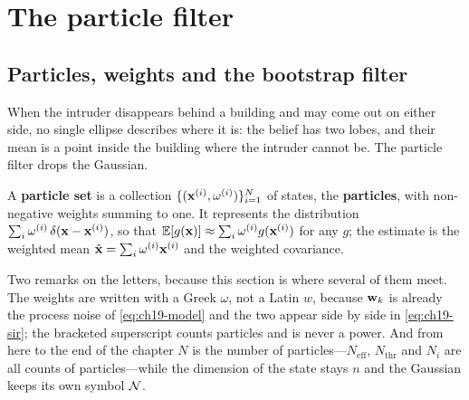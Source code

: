 \section{The particle filter}
\label{sec:ch19-pf}

\subsection{Particles, weights and the bootstrap filter}
\label{sec:ch19-pf-idea}

When the intruder disappears behind a building and may come out on either
side, no single ellipse describes where it is: the belief has two lobes,
and their mean is a point inside the building where the intruder cannot
be. The particle filter drops the Gaussian.

\begin{definition}
\label{def:ch19-particles}
A \textbf{particle set} is a collection
$\{(\mathbf{x}^{(i)}, \omega^{(i)})\}_{i=1}^N$ of states, the \textbf{particles},
with non-negative weights summing to one. It represents the distribution
$\sum_i \omega^{(i)}\,\delta(\mathbf{x} - \mathbf{x}^{(i)})$, so that $\mathbb{E}[g(\mathbf{x})]
\approx \sum_i \omega^{(i)} g(\mathbf{x}^{(i)})$ for any $g$; the estimate is the
weighted mean $\hat{\mathbf{x}} = \sum_i \omega^{(i)}\mathbf{x}^{(i)}$ and the weighted
covariance.
\end{definition}

Two remarks on the letters, because this section is where several of them
meet. The weights are written with a Greek $\omega$, not a Latin $w$, because
$\mathbf{w}_k$ is already the process noise of \cref{eq:ch19-model} and the two
appear side by side in \cref{eq:ch19-sir}; the bracketed superscript counts
particles and is never a power. And from here to the end of the chapter $N$ is
the number of particles---$N_{\mathrm{eff}}$, $N_{\mathrm{thr}}$ and $N_i$ are
all counts of particles---while the dimension of the state stays $n$ and the
Gaussian keeps its own symbol $\mathcal{N}$.

